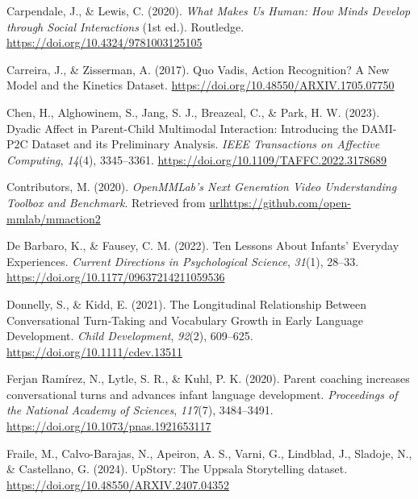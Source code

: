 \documentclass[
  man,floatsintext]{apa6}
\newlength{\cslhangindent}
\newenvironment{CSLReferences}[2] %
 {\begin{list}{}{%
  \setlength{\itemindent}{0pt}
  \setlength{\leftmargin}{0pt}
  \setlength{\parsep}{0pt}
  \ifodd #1
   \setlength{\leftmargin}{\cslhangindent}
   \setlength{\itemindent}{-1\cslhangindent}
  \fi
  \setlength{\itemsep}{#2\baselineskip}}}
 {\end{list}}
\begin{document}
\begin{CSLReferences}{1}{0}
Carpendale, J., \& Lewis, C. (2020). \emph{What {Makes Us Human}: {How Minds Develop} through {Social Interactions}} (1st ed.). Routledge. \url{https://doi.org/10.4324/9781003125105}

Carreira, J., \& Zisserman, A. (2017). Quo {Vadis}, {Action Recognition}? {A New Model} and the {Kinetics Dataset}. \url{https://doi.org/10.48550/ARXIV.1705.07750}

Chen, H., Alghowinem, S., Jang, S. J., Breazeal, C., \& Park, H. W. (2023). Dyadic {Affect} in {Parent-Child Multimodal Interaction}: {Introducing} the {DAMI-P2C Dataset} and its {Preliminary Analysis}. \emph{IEEE Transactions on Affective Computing}, \emph{14}(4), 3345--3361. \url{https://doi.org/10.1109/TAFFC.2022.3178689}

Contributors, M. (2020). \emph{{OpenMMLab}'s {Next Generation Video Understanding Toolbox} and {Benchmark}}. Retrieved from \url{urlhttps://github.com/open-mmlab/mmaction2}

De Barbaro, K., \& Fausey, C. M. (2022). Ten {Lessons About Infants}' {Everyday Experiences}. \emph{Current Directions in Psychological Science}, \emph{31}(1), 28--33. \url{https://doi.org/10.1177/09637214211059536}

Donnelly, S., \& Kidd, E. (2021). The {Longitudinal Relationship Between Conversational Turn}‐{Taking} and {Vocabulary Growth} in {Early Language Development}. \emph{Child Development}, \emph{92}(2), 609--625. \url{https://doi.org/10.1111/cdev.13511}

Ferjan Ramírez, N., Lytle, S. R., \& Kuhl, P. K. (2020). Parent coaching increases conversational turns and advances infant language development. \emph{Proceedings of the National Academy of Sciences}, \emph{117}(7), 3484--3491. \url{https://doi.org/10.1073/pnas.1921653117}

Fraile, M., Calvo-Barajas, N., Apeiron, A. S., Varni, G., Lindblad, J., Sladoje, N., \& Castellano, G. (2024). {UpStory}: The {Uppsala Storytelling} dataset. \url{https://doi.org/10.48550/ARXIV.2407.04352}


\end{CSLReferences}
\end{document}
